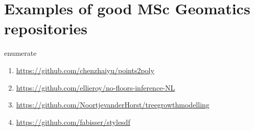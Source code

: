 \section{Examples of good MSc Geomatics repositories}

enumerate
\begin{enumerate}
  \item \url{https://github.com/chenzhaiyu/points2poly}
  \item \url{https://github.com/ellieroy/no-floors-inference-NL}
  \item \url{https://github.com/NoortjevanderHorst/treegrowthmodelling}
  \item \url{https://github.com/fabisser/stylesdf}
\end{enumerate}
